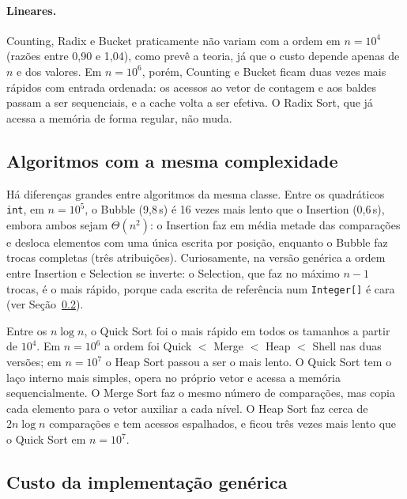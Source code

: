 \documentclass[11pt,a4paper]{article}
\begin{document}
\paragraph{Lineares.} Counting, Radix e Bucket praticamente não variam com a ordem em $n=10^4$
(razões entre 0,90 e 1,04), como prevê a teoria, já que o custo depende apenas de $n$ e dos
valores. Em $n=10^6$, porém, Counting e Bucket ficam duas vezes mais rápidos com entrada ordenada:
os acessos ao vetor de contagem e aos baldes passam a ser sequenciais, e a cache volta a ser
efetiva. O Radix Sort, que já acessa a memória de forma regular, não muda.

\subsection{Algoritmos com a mesma complexidade}

Há diferenças grandes entre algoritmos da mesma classe. Entre os quadráticos \texttt{int}, em
$n=10^5$, o Bubble (9,8\,s) é 16 vezes mais lento que o Insertion (0,6\,s), embora ambos sejam
$\Theta(n^2)$: o Insertion faz em média metade das comparações e desloca elementos com uma única
escrita por posição, enquanto o Bubble faz trocas completas (três atribuições). Curiosamente, na
versão genérica a ordem entre Insertion e Selection se inverte: o Selection, que faz no máximo
$n-1$ trocas, é o mais rápido, porque cada escrita de referência num \texttt{Integer[]} é cara
(ver Seção~\ref{sec:generico}).

Entre os $n\log n$, o Quick Sort foi o mais rápido em todos os tamanhos a partir de $10^4$. Em
$n=10^6$ a ordem foi Quick $<$ Merge $<$ Heap $<$ Shell nas duas versões; em $n=10^7$ o Heap Sort
passou a ser o mais lento. O Quick Sort tem o laço interno mais simples, opera no próprio vetor e
acessa a memória sequencialmente. O Merge Sort faz o mesmo número de comparações, mas copia cada
elemento para o vetor auxiliar a cada nível. O Heap Sort faz cerca de $2n\log n$ comparações e tem
acessos espalhados, e ficou três vezes mais lento que o Quick Sort em $n=10^7$.

\subsection{Custo da implementação genérica}\label{sec:generico}
\end{document}
